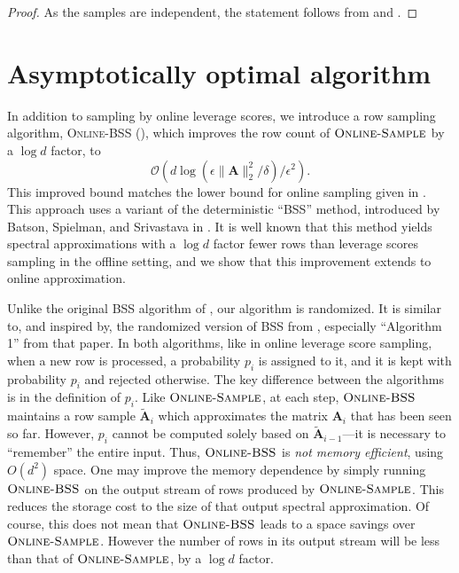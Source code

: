 \documentclass{toc}
\newcommand{\Oh}{\ensuremath{\mathcal{O}}}
\newcommand{\bv}[1]{\mathbf{#1}}
\newcommand{\norm}[1]{\|#1\|}
\begin{document}
\begin{proof}
  As the samples are independent, the statement follows from  and 
.
\end{proof}

\section{Asymptotically optimal algorithm}
\label{sec:bss}
In addition to sampling by online leverage scores, we introduce a row sampling algorithm,  %
\textsc{Online-BSS} (), which improves the row count of $\textsc{Online-Sample}$ by a  $\log d$ factor, to
%
\[
  \Oh(d \log(\epsilon\norm{\bv{A}}_2^2/\delta)/\epsilon^2).
\]
This improved bound matches the lower bound for online sampling given
in . This approach uses a variant of
the deterministic ``BSS'' method, introduced by Batson, Spielman, and
Srivastava in \cite{batson2012twice}. It is well known that this
method yields spectral approximations with a $\log d$ factor fewer
rows than leverage scores sampling in the offline setting, and we show
that this improvement extends to online approximation.

Unlike the original BSS algorithm of \cite{batson2012twice}, our algorithm is randomized. 
It is similar to, and inspired by, the randomized version of BSS from \cite{lee2015linear}, especially ``Algorithm 1'' from that paper. In both algorithms, like in online leverage score sampling, when a new row is processed, a probability $p_i$ is assigned to it, and it is kept with probability $p_i$ and rejected otherwise. The key difference between the algorithms is in the definition of $p_i$. Like $\textsc{Online-Sample}$, at each step, $\textsc{Online-BSS}$ maintains a row sample $\bv{\tilde A}_i$ which approximates the matrix $\bv{A}_i$ that has been seen so far. However,  $p_i$ cannot be computed solely based on $\bv{\tilde A}_{i-1}$---it is necessary to ``remember'' the entire input.  Thus, $\textsc{Online-BSS}$ is \emph{not memory efficient}, using $O(d^2)$ space.  One may improve the memory dependence by simply running $\textsc{Online-BSS}$ on the output stream of rows produced by $\textsc{Online-Sample}$.  This reduces the storage cost to the size of that output spectral approximation.  Of course, this does not mean that $\textsc{Online-BSS}$ leads to a space savings over $\textsc{Online-Sample}$. However the number of rows in its output stream will be less than that of $\textsc{Online-Sample}$, by a $\log d$ factor. %
\end{document}
